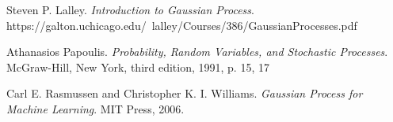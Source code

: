 \documentclass[12pt,a4paper]{article}
\theoremstyle{definition}
\numberwithin{equation}{section}
\begin{document}
%
%
%
%
%
\newpage
\begin{thebibliography}{10}

Steven P. Lalley.
\textit{Introduction to Gaussian Process}. 
https://galton.uchicago.edu/~lalley/Courses/386/GaussianProcesses.pdf

Athanasios Papoulis.
\textit{Probability, Random Variables, and Stochastic Processes}. 
McGraw-Hill, New York, third edition, 1991, p. 15, 17

Carl E. Rasmussen and Christopher K. I. Williams.
\textit{Gaussian Process for Machine Learning}. 
MIT Press, 2006.


%
%
%
%
%
\end{thebibliography}
%
\end{document}
